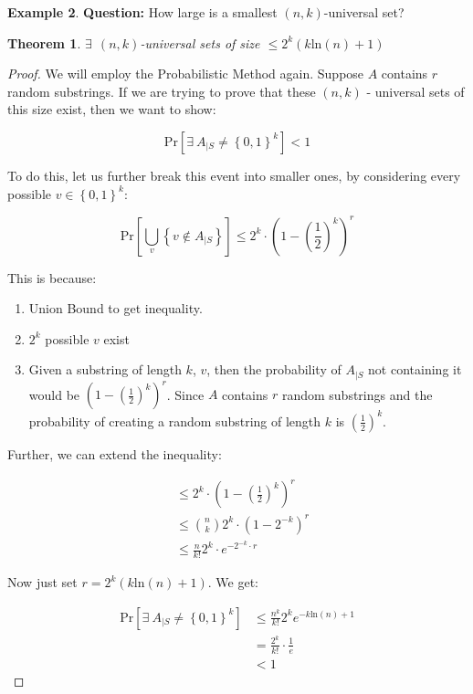 \documentclass[psamsfonts, 12pt]{amsart}
\newtheorem{thm}{Theorem}[section]
\theoremstyle{definition}
\newtheorem{exmp}[thm]{Example}
\theoremstyle{remark}
\let\oldexists\exists
\renewcommand\exists{\oldexists~}
\begin{document}
\begin{exmp}
\textbf{Question:} How large is a smallest $(n,k)$-universal set?

\begin{thm}
$\exists\ (n,k)$-universal sets of size $\leq 2^k(k\text{ln}(n) + 1)$
\end{thm}

\begin{proof}
We will employ the Probabilistic Method again. Suppose $A$ contains $r$ random substrings. If we are trying to prove that these $(n,k)$ - universal sets of this size exist, then we want to show:

\[
\text{Pr}\left[ \exists A_{|S} \neq \left\lbrace 0,1 \right\rbrace^k \right] < 1
\]

To do this, let us further break this event into smaller ones, by considering every possible $v \in \left\lbrace 0,1 \right\rbrace^k$:

\[
\text{Pr}\left[ \bigcup_{v} \left\lbrace v\not\in A_{|S} \right\rbrace \right] \leq 2^k \cdot (1 - (\frac{1}{2})^k)^r
\]

This is because:
\begin{enumerate}
  \item Union Bound to get inequality.
  \item $2^k$ possible $v$ exist
  \item Given a substring of length $k$, $v$, then the probability of $A_{|S}$ not containing it would be $(1 - (\frac{1}{2})^k)^r$. Since $A$ contains $r$ random substrings and the probability of creating a random substring of length $k$ is $(\frac{1}{2})^k$.
\end{enumerate}

Further, we can extend the inequality:

\begin{align*}
&\leq 2^k \cdot (1 - (\frac{1}{2})^k)^r \\
&\leq {n\choose k}2^k \cdot (1-2^{-k})^r \\
&\leq \frac{n}{k!}2^k \cdot e^{-2^{-k}\cdot r}
\end{align*}

Now just set $r = 2^k(k\text{ln}(n) + 1) $. We get:

\begin{align*}
\text{Pr}\left[ \exists A_{|S} \neq \left\lbrace 0,1 \right\rbrace^k \right] &\leq
\frac{n^k}{k!}2^ke^{-k\text{ln}(n)+1}\\
&=\frac{2^k}{k!}\cdot \frac{1}{e}\\
&< 1
\end{align*}
\end{proof}
\end{exmp}
\end{document}
